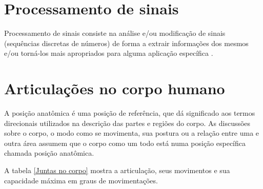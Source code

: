  \section{Processamento de sinais}
  \label{sec:processamentoSinais}
  Processamento de sinais consiste na análise e/ou modificação de sinais
(sequências discretas de números) de forma a extrair
informações dos mesmos e/ou torná-los mais apropriados para alguma aplicação específica \cite{processamentoSinais}.

   \section{Articulações no corpo humano}
   \label{sec:Juntas no corpo humano}
    A posição anatômica é uma posição de referência, que dá significado aos termos
    direcionais utilizados na descrição das partes e regiões do corpo. As discussões
    sobre o corpo, o modo como se movimenta, sua postura ou a relação entre uma e
   outra área assumem que o corpo como um todo está numa posição específica chamada
    posição anatômica.

     A tabela \ref{Juntas no corpo} mostra a articulação, seus movimentos e sua capacidade máxima em
   graus de movimentações.

